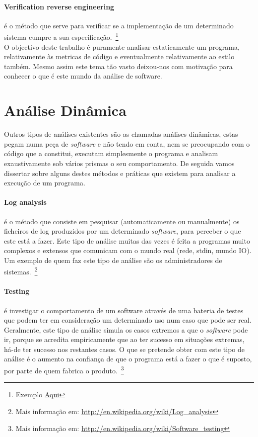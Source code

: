 \paragraph{Verification reverse engineering} é o método que serve para verificar se a implementação de um determinado sistema cumpre a sua especificação.~\footnote{Exemplo \href{http://docs.google.com/viewer?a=v&q=cache:_L5qP0rI96EJ:citeseerx.ist.psu.edu/viewdoc/download\%3Fdoi\%3D10.1.1.4.3018\%26rep\%3Drep1\%26type\%3Dpdf+verification+reverse+engineering&hl=en&pid=bl&srcid=ADGEESia4DLaaR6tVvzu1taWn_c19TP6FB9Tjb7UuLp5DlgboBCt4JN33qutEXnlmxS5dpUzVIfJy-sNUj38vQJaEz-F5GmQxYlbs7ei97y28QaKaxovm5vicKnCBc441jF2M2wi6JQg&sig=AHIEtbSaUaw3fdOCFHTavKW5ulxx4zPiWw}{Aqui}}\\

O objectivo deste trabalho é puramente analisar estaticamente um programa, relativamente às metricas de código e eventualmente relativamente ao estilo também.
Mesmo assim este tema tão vasto deixou-nos com motivação para conhecer o que é este mundo da análise de software.\\

\section{Análise Dinâmica}
Outros tipos de análises existentes são as chamadas análises dinâmicas, estas pegam numa peça de \emph{software} e não tendo em conta, 
nem se preocupando com o código que a constitui, executam simplesmente o programa e analisam exaustivamente sob vários prismas o seu comportamento.
De seguida vamos dissertar sobre alguns destes métodos e práticas que existem para analisar a execução de um programa.\\

\paragraph{Log analysis} é o método que consiste em pesquisar (automaticamente ou manualmente) 
os ficheiros de log produzidos por um determinado \emph{software}, para perceber o que este está a fazer. 
Este tipo de análise muitas das vezes é feita a programas muito complexos e extensos que comunicam com o mundo real (rede, stdin, mundo IO).
Um exemplo de quem faz este tipo de análise são os administradores de sistemas.~\footnote{Mais informação em: \url{http://en.wikipedia.org/wiki/Log_analysis}}

\paragraph{Testing} é investigar o comportamento de um software através de uma bateria de testes que podem ter em consideração um determinado uso num caso que pode ser real. 
Geralmente, este tipo de análise simula os casos extremos a que o \emph{software} pode ir, porque se acredita empiricamente que ao ter sucesso em situações extremas, 
há-de ter sucesso nos restantes casos.
O que se pretende obter com este tipo de análise é o aumento na confiança de que o programa está a fazer o que é suposto, por parte de quem fabrica o produto.~\footnote{Mais informação em: \url{http://en.wikipedia.org/wiki/Software_testing}}


